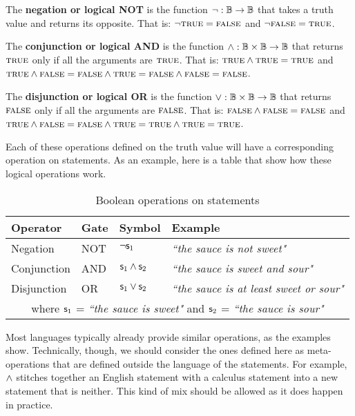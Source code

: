 \documentclass[11pt,letterpaper,fleqn]{memoir} %
\begin{document}
\begin{mathSection}
	\begin{defn}
		The \textbf{negation or logical NOT} is the function $\neg : \mathbb{B} \to \mathbb{B}$ that takes a truth value and returns its opposite. That is: $\neg \textsc{true} = \textsc{false}$ and $\neg \textsc{false} = \textsc{true}$.
	\end{defn}
	
	\begin{defn}
		The \textbf{conjunction or logical AND} is the function $\wedge : \mathbb{B} \times \mathbb{B} \to \mathbb{B}$ that returns $\textsc{true}$ only if all the arguments are $\textsc{true}$. That is: $\textsc{true} \wedge \textsc{true} = \textsc{true}$ and $\textsc{true} \wedge \textsc{false} =\textsc{false} \wedge \textsc{true} =\textsc{false} \wedge \textsc{false} = \textsc{false}$.
	\end{defn}
	
	\begin{defn}
		The \textbf{disjunction or logical OR} is the function $\vee : \mathbb{B} \times \mathbb{B} \to \mathbb{B}$ that returns $\textsc{false}$ only if all the arguments are $\textsc{false}$. That is: $\textsc{false} \wedge \textsc{false} = \textsc{false}$ and $\textsc{true} \wedge \textsc{false} =\textsc{false} \wedge \textsc{true} =\textsc{true} \wedge \textsc{true} = \textsc{true}$.
	\end{defn}
\end{mathSection}

Each of these operations defined on the truth value will have a corresponding operation on statements. As an example, here is a table that show how these logical operations work.
\begin{table}[h]
	\centering
	\begin{tabular}{p{} p{} p{} p{}}
		Operator & Gate & Symbol & Example \\ 
		\hline 
		Negation & NOT & $\neg \mathsf{s}_1$ &  \emph{``the sauce is not sweet"} \\ 
		Conjunction & AND & $\mathsf{s}_1 \wedge \mathsf{s}_2$ & \emph{``the sauce is sweet and sour"} \\ 
		Disjunction & OR & $\mathsf{s}_1 \vee \mathsf{s}_2$ & \emph{``the sauce is at least sweet or sour"}\\
		\multicolumn{4}{c}{  where $\mathsf{s}_1$ = \emph{``the sauce is sweet"} and $\mathsf{s}_2$ = \emph{``the sauce is sour"}}
	\end{tabular} 
	\caption{Boolean operations on statements}
\end{table}

Most languages typically already provide similar operations, as the examples show. Technically, though, we should consider the ones defined here as meta-operations that are defined outside the language of the statements. For example, $\wedge$ stitches together an English statement with a calculus statement into a new statement that is neither. This kind of mix should be allowed as it does happen in practice.
\end{document}
